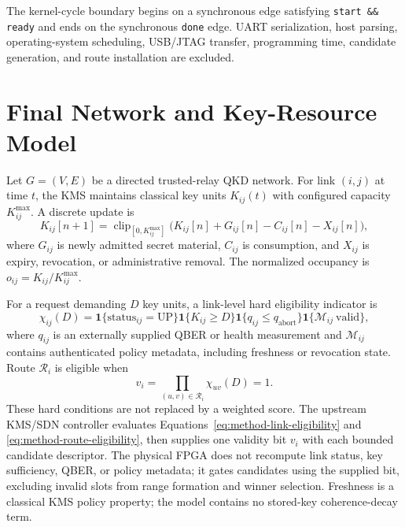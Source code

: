 The kernel-cycle boundary begins on a synchronous edge satisfying
\texttt{start \&\& ready} and ends on the synchronous \texttt{done} edge. UART
serialization, host parsing, operating-system scheduling, USB/JTAG transfer,
programming time, candidate generation, and route installation are excluded.

\section{Final Network and Key-Resource Model}

Let $G=(V,E)$ be a directed trusted-relay QKD network. For link $(i,j)$ at time
$t$, the KMS maintains classical key units $K_{ij}(t)$ with configured capacity
$K_{ij}^{\max}$. A discrete update is
\begin{equation}
K_{ij}[n+1]=\operatorname{clip}_{[0,K_{ij}^{\max}]}
\bigl(K_{ij}[n]+G_{ij}[n]-C_{ij}[n]-X_{ij}[n]\bigr),
\label{eq:method-key-balance}
\end{equation}
where $G_{ij}$ is newly admitted secret material, $C_{ij}$ is consumption, and
$X_{ij}$ is expiry, revocation, or administrative removal. The normalized
occupancy is $o_{ij}=K_{ij}/K_{ij}^{\max}$.

For a request demanding $D$ key units, a link-level hard eligibility indicator is
\begin{equation}
\chi_{ij}(D)=
\mathbf 1\{\mathrm{status}_{ij}=\mathrm{UP}\}
\mathbf 1\{K_{ij}\ge D\}
\mathbf 1\{q_{ij}\le q_{\mathrm{abort}}\}
\mathbf 1\{\mathcal M_{ij}\ \mathrm{valid}\},
\label{eq:method-link-eligibility}
\end{equation}
where $q_{ij}$ is an externally supplied QBER or health measurement and
$\mathcal M_{ij}$ contains authenticated policy metadata, including freshness or
revocation state. Route $\mathcal R_i$ is eligible when
\begin{equation}
v_i=\prod_{(u,v)\in\mathcal R_i}\chi_{uv}(D)=1.
\label{eq:method-route-eligibility}
\end{equation}
These hard conditions are not replaced by a weighted score. The upstream KMS/SDN
controller evaluates Equations~\eqref{eq:method-link-eligibility} and
\eqref{eq:method-route-eligibility}, then supplies one validity bit $v_i$ with each
bounded candidate descriptor. The physical FPGA does not recompute link status,
key sufficiency, QBER, or policy metadata; it gates candidates using the supplied
bit, excluding invalid slots from range formation and winner selection. Freshness
is a classical KMS policy property; the model contains no stored-key
coherence-decay term.

